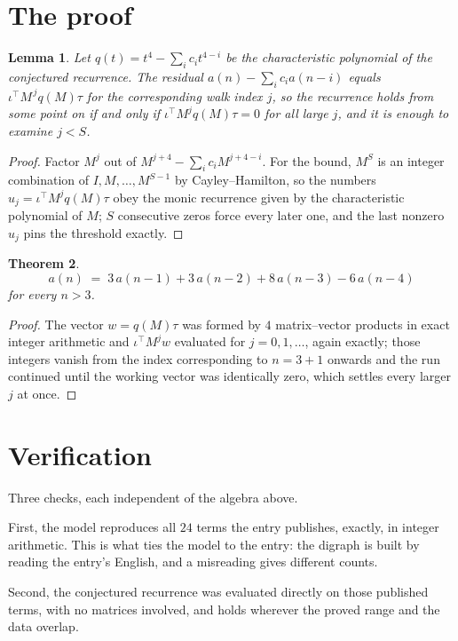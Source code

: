 \documentclass[11pt,a4paper]{article}
\theoremstyle{plain}
\newtheorem{theorem}{Theorem}
\newtheorem{lemma}[theorem]{Lemma}
\theoremstyle{definition}
\begin{document}
\section{The proof}

\begin{lemma}\label{lem:crit}
Let $q(t)=t^{4}-\sum_i c_it^{4-i}$ be the characteristic polynomial of the
conjectured recurrence. The residual $a(n)-\sum_ic_ia(n-i)$ equals
$\iota^{\!\top}M^{\,j}q(M)\tau$ for the corresponding walk index $j$, so the recurrence
holds from some point on if and only if $\iota^{\!\top}M^{j}q(M)\tau=0$ for all large $j$,
and it is enough to examine $j<S$.
\end{lemma}

\begin{proof}
Factor $M^{j}$ out of $M^{j+4}-\sum_ic_iM^{j+4-i}$. For the bound, $M^{S}$
is an integer combination of $I,M,\dots,M^{S-1}$ by Cayley--Hamilton, so the numbers
$u_j=\iota^{\!\top}M^{j}q(M)\tau$ obey the monic recurrence given by the characteristic
polynomial of $M$; $S$ consecutive zeros force every later one, and the last nonzero $u_j$
pins the threshold exactly.
\end{proof}

\begin{theorem}
\[
a(n)\;=\;3\,a(n-1) + 3\,a(n-2) + 8\,a(n-3) - 6\,a(n-4)
\]
for every $n>3$.
\end{theorem}

\begin{proof}
The vector $w=q(M)\tau$ was formed by $4$ matrix--vector products in exact integer
arithmetic and $\iota^{\!\top}M^{j}w$ evaluated for $j=0,1,\dots$, again exactly; those
integers vanish from the index corresponding to $n=3+1$ onwards and the run continued
until the working vector was identically zero, which settles every larger $j$ at once.
\end{proof}

\section{Verification}

Three checks, each independent of the algebra above.

First, the model reproduces all $24$ terms the entry publishes, exactly, in integer
arithmetic. This is what ties the model to the entry: the digraph is built by reading the
entry's English, and a misreading gives different counts.

Second, the conjectured recurrence was evaluated directly on those published terms, with no
matrices involved, and holds wherever the proved range and the data overlap.
\end{document}
